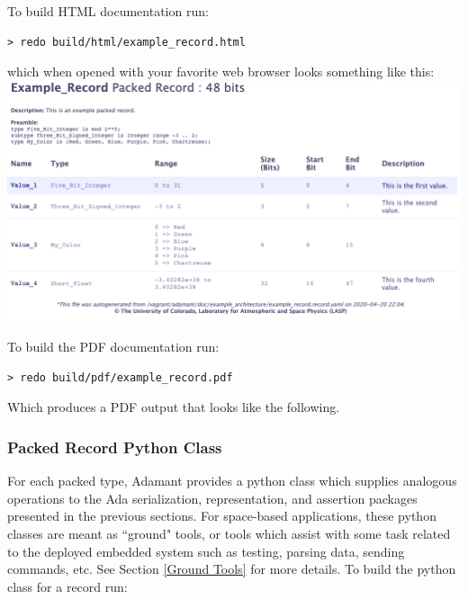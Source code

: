 To build HTML documentation run:

\vspace{5mm} %
\begin{verbatim}
> redo build/html/example_record.html
\end{verbatim}
\vspace{5mm} %

which when opened with your favorite web browser looks something like this: \\

\vspace{5mm} %
\includegraphics[width=\textwidth]{images/recordhtml.png}
\vspace{5mm} %

To build the PDF documentation run:

\vspace{5mm} %
\begin{verbatim}
> redo build/pdf/example_record.pdf
\end{verbatim}
\vspace{5mm} %

Which produces a PDF output that looks like the following. \\

\noindent\makebox[\linewidth]{\rule{\textwidth}{0.4pt}}

\noindent\makebox[\linewidth]{\rule{\textwidth}{0.4pt}}

\subsubsection{Packed Record Python Class} \label{Packed Record Python Class}

For each packed type, Adamant provides a python class which supplies analogous operations to the Ada serialization, representation, and assertion packages presented in the previous sections. For space-based applications, these python classes are meant as ``ground" tools, or tools which assist with some task related to the deployed embedded system such as testing, parsing data, sending commands, etc. See Section \ref{Ground Tools} for more details. To build the python class for a record run:

